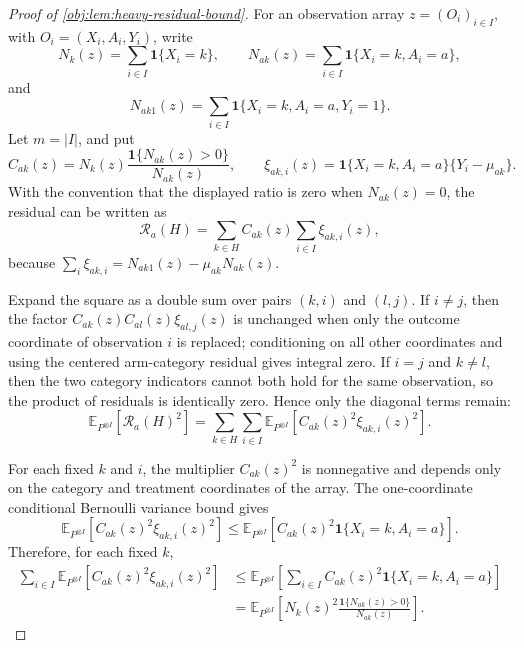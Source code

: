 \begin{proof}[Proof of \cref{obj:lem:heavy-residual-bound}]
For an observation array \(z=(O_i)_{i\in I}\), with \(O_i=(X_i,A_i,Y_i)\), write
\[
N_k(z)=\sum_{i\in I}\mathbf 1\{X_i=k\},
\qquad
N_{ak}(z)=\sum_{i\in I}\mathbf 1\{X_i=k,A_i=a\},
\]
and
\[
N_{ak1}(z)=\sum_{i\in I}\mathbf 1\{X_i=k,A_i=a,Y_i=1\}.
\]
Let \(m=|I|\), and put
\[
C_{ak}(z)
=
N_k(z)\frac{\mathbf 1\{N_{ak}(z)>0\}}{N_{ak}(z)},
\qquad
\xi_{ak,i}(z)
=
\mathbf 1\{X_i=k,A_i=a\}\{Y_i-\mu_{ak}\}.
\]
With the convention that the displayed ratio is zero when \(N_{ak}(z)=0\), the residual can be written as
\[
\mathcal R_a(H)
=
\sum_{k\in H}C_{ak}(z)\sum_{i\in I}\xi_{ak,i}(z),
\]
because \(\sum_i\xi_{ak,i}=N_{ak1}(z)-\mu_{ak}N_{ak}(z)\).

Expand the square as a double sum over pairs \((k,i)\) and \((l,j)\). If \(i\ne j\), then the factor
\(C_{ak}(z)C_{al}(z)\xi_{al,j}(z)\) is unchanged when only the outcome coordinate of observation \(i\) is replaced; conditioning on all other coordinates and using the centered arm-category residual gives integral zero. If \(i=j\) and \(k\ne l\), then the two category indicators cannot both hold for the same observation, so the product of residuals is identically zero. Hence only the diagonal terms remain:
\[
\mathbb E_{P^{\otimes I}}\!\left[\mathcal R_a(H)^2\right]
=
\sum_{k\in H}\sum_{i\in I}
\mathbb E_{P^{\otimes I}}\!\left[C_{ak}(z)^2\xi_{ak,i}(z)^2\right].
\]

For each fixed \(k\) and \(i\), the multiplier \(C_{ak}(z)^2\) is nonnegative and depends only on the category and treatment coordinates of the array. The one-coordinate conditional Bernoulli variance bound gives
\[
\mathbb E_{P^{\otimes I}}\!\left[C_{ak}(z)^2\xi_{ak,i}(z)^2\right]
\le
\mathbb E_{P^{\otimes I}}\!\left[
C_{ak}(z)^2\mathbf 1\{X_i=k,A_i=a\}
\right].
\]
Therefore, for each fixed \(k\),
\[
\begin{aligned}
\sum_{i\in I}
\mathbb E_{P^{\otimes I}}\!\left[C_{ak}(z)^2\xi_{ak,i}(z)^2\right]
&\le
\mathbb E_{P^{\otimes I}}\!\left[
\sum_{i\in I}C_{ak}(z)^2\mathbf 1\{X_i=k,A_i=a\}
\right]\\
&=
\mathbb E_{P^{\otimes I}}\!\left[
N_k(z)^2\frac{\mathbf 1\{N_{ak}(z)>0\}}{N_{ak}(z)}
\right].
\end{aligned}
\]


\end{proof}
